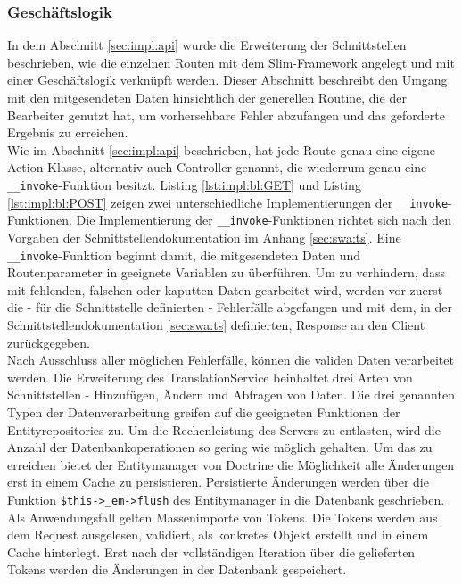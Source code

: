 \documentclass[10pt, oneside, ngerman]{article}
\begin{document}
  \subsubsection{Geschäftslogik}\label{sec:impl:bl} %
    In dem Abschnitt \ref{sec:impl:api} wurde die Erweiterung der Schnittstellen beschrieben, wie die einzelnen Routen mit dem Slim-Framework angelegt und 
    mit einer Geschäftslogik verknüpft werden. Dieser Abschnitt beschreibt den Umgang mit den mitgesendeten Daten hinsichtlich der generellen Routine, die der Bearbeiter
    genutzt hat, um vorhersehbare Fehler abzufangen und das geforderte Ergebnis zu erreichen.\\ 
    Wie im Abschnitt \ref{sec:impl:api} beschrieben, hat jede Route genau eine eigene Action-Klasse, alternativ auch Controller genannt, die wiederrum genau eine \lstinline{__invoke}-Funktion besitzt. Listing \ref{lst:impl:bl:GET} und Listing \ref{lst:impl:bl:POST} 
    zeigen zwei unterschiedliche Implementierungen der \lstinline{__invoke}-Funktionen. Die Implementierung der \lstinline{__invoke}-Funktionen richtet sich nach den Vorgaben der Schnittstellendokumentation im Anhang \ref{sec:swa:ts}.
    Eine \lstinline{__invoke}-Funktion beginnt damit, die mitgesendeten Daten und Routenparameter in geeignete Variablen zu überführen. Um zu verhindern, dass mit 
    fehlenden, falschen oder kaputten Daten gearbeitet wird, werden vor zuerst die - für die Schnittstelle definierten - Fehlerfälle abgefangen und mit dem, in der Schnittstellendokumentation \ref{sec:swa:ts} definierten, Response
    an den Client zurückgegeben.\\
    Nach Ausschluss aller möglichen Fehlerfälle, können die validen Daten verarbeitet werden. Die Erweiterung des TranslationService beinhaltet drei Arten von Schnittstellen - Hinzufügen, Ändern und Abfragen von Daten.
    Die drei genannten Typen der Datenverarbeitung greifen auf die geeigneten Funktionen der Entityrepositories zu. Um die Rechenleistung des Servers zu entlasten, wird die Anzahl der Datenbankoperationen so 
    gering wie möglich gehalten. Um das zu erreichen bietet der Entitymanager von Doctrine die Möglichkeit alle Änderungen erst in einem Cache zu persistieren. Persistierte Änderungen werden 
    über die Funktion \lstinline{$this->_em->flush} des Entitymanager in die Datenbank geschrieben. Als Anwendungsfall gelten Massenimporte von Tokens. Die Tokens werden aus dem Request ausgelesen, validiert, als konkretes Objekt erstellt und in einem Cache hinterlegt.
    Erst nach der vollständigen Iteration über die gelieferten Tokens werden die Änderungen in der Datenbank gespeichert.\\
\end{document}
